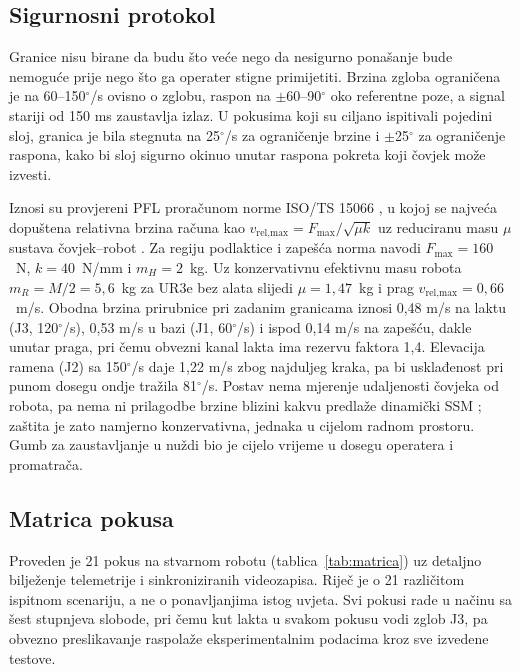 \subsection{Sigurnosni protokol}

Granice nisu birane da budu što veće nego da nesigurno ponašanje bude nemoguće
prije nego što ga operater stigne primijetiti. Brzina zgloba ograničena je na
60--150$^\circ$/s ovisno o zglobu, raspon na $\pm$60--90$^\circ$ oko referentne
poze, a signal stariji od 150 ms zaustavlja izlaz. U pokusima koji su ciljano
ispitivali pojedini sloj, granica je bila stegnuta na 25$^\circ$/s za ograničenje brzine
i $\pm$25$^\circ$ za ograničenje raspona, kako bi sloj sigurno okinuo unutar
raspona pokreta koji čovjek može izvesti.

Iznosi su provjereni PFL proračunom norme ISO/TS 15066 \cite{iso15066}, u kojoj se
najveća dopuštena relativna brzina računa kao $v_\text{rel,max} = F_\text{max}/\sqrt{\mu k}$
uz reduciranu masu $\mu$ sustava čovjek--robot \cite[str.~4]{ghanbarzadeh2025}. Za regiju
podlaktice i zapešća norma navodi $F_\text{max} = 160$~N, $k = 40$~N/mm i $m_H = 2$~kg. Uz
konzervativnu efektivnu masu robota $m_R = M/2 = 5{,}6$~kg za UR3e bez alata slijedi
$\mu = 1{,}47$~kg i prag $v_\text{rel,max} = 0{,}66$~m/s. Obodna brzina prirubnice pri
zadanim granicama iznosi 0,48 m/s na laktu (J3, 120$^\circ$/s), 0,53 m/s u bazi
(J1, 60$^\circ$/s) i ispod 0,14 m/s na zapešću, dakle unutar praga, pri čemu obvezni kanal
lakta ima rezervu faktora 1,4. Elevacija ramena (J2) sa 150$^\circ$/s daje 1,22 m/s zbog
najduljeg kraka, pa bi usklađenost pri punom dosegu ondje tražila 81$^\circ$/s.
Postav nema mjerenje udaljenosti čovjeka od robota, pa nema ni
prilagodbe brzine blizini kakvu predlaže dinamički SSM \cite[str.~1]{peng2025};
zaštita je zato namjerno konzervativna, jednaka u cijelom radnom prostoru.
Gumb za zaustavljanje u nuždi bio je cijelo vrijeme u dosegu operatera i
promatrača.

\subsection{Matrica pokusa}

Proveden je 21 pokus na stvarnom robotu (tablica~\ref{tab:matrica}) uz detaljno bilježenje telemetrije i sinkroniziranih videozapisa. Riječ je o 21 različitom ispitnom scenariju, a ne o ponavljanjima istog uvjeta. Svi pokusi rade u načinu sa šest stupnjeva slobode, pri čemu kut lakta u svakom pokusu vodi zglob J3, pa obvezno preslikavanje raspolaže eksperimentalnim podacima kroz sve izvedene testove.

